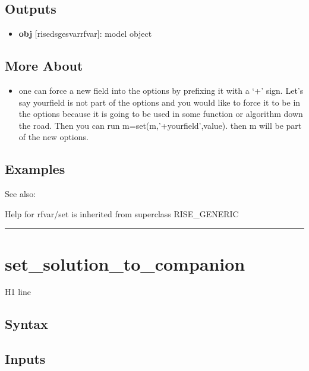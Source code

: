 \documentclass[letterpaper,10pt,english]{sphinxmanual}
\begin{document}
\subsection{Outputs}
\label{classes/models/@rfvar/rfvar:id113}\begin{itemize}
\item {} 
\textbf{obj} {[}rise\textbar{}dsge\textbar{}svar\textbar{}rfvar{]}: model object

\end{itemize}


\subsection{More About}
\label{classes/models/@rfvar/rfvar:id114}\begin{itemize}
\item {} 
one can force a new field into the options by prefixing it with a `+'
sign. Let's say yourfield is not part of the options and you would like
to force it to be in the options because it is going to be used in some
function or algorithm down the road. Then you can run
m=set(m,'+yourfield',value). then m will be part of the new options.

\end{itemize}


\subsection{Examples}
\label{classes/models/@rfvar/rfvar:id115}
See also:

Help for rfvar/set is inherited from superclass RISE\_GENERIC


\bigskip\hrule{}\bigskip



\section{set\_solution\_to\_companion}
\label{classes/models/@rfvar/rfvar:id116}\label{classes/models/@rfvar/rfvar:set-solution-to-companion}
H1 line


\subsection{Syntax}
\label{classes/models/@rfvar/rfvar:id117}

\subsection{Inputs}
\label{classes/models/@rfvar/rfvar:id118}
\end{document}
